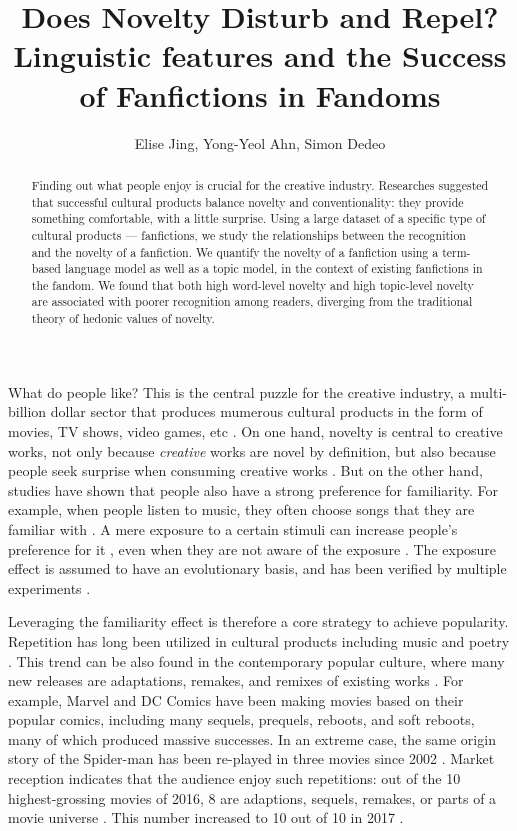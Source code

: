\documentclass[letterpaper]{article} %
\begin{document}
%
\title{Does Novelty Disturb and Repel? Linguistic features and the Success of Fanfictions in Fandoms}
\author{Elise Jing, Yong-Yeol Ahn, Simon Dedeo\\
}
\maketitle
\begin{abstract}
Finding out what people enjoy is crucial for the creative industry. Researches suggested that successful cultural products balance novelty and conventionality: they provide something comfortable, with a little surprise. Using a large dataset of a specific type of cultural products --- fanfictions, we study the relationships between the recognition and the novelty of a fanfiction. We quantify the novelty of a fanfiction using a term-based language model as well as a topic model, in the context of existing fanfictions in the fandom. We found that both high word-level novelty and high topic-level novelty are associated with poorer recognition among readers, diverging from the traditional theory of hedonic values of novelty.
\end{abstract}

\noindent 
What do people like? This is the central puzzle for the creative industry, a multi-billion dollar sector that produces mumerous cultural products in the form of movies, TV shows, video games, etc \cite{creativeindustries}. On one hand, novelty is central to creative works, not only because \emph{creative} works are novel by definition, but also because people seek surprise when consuming creative works \cite{hutter2011infinite}. But on the other hand, studies have shown that people also have a strong preference for familiarity. For example, when people listen to music, they often choose songs that they are familiar with \cite{thompson2014shazam}. A mere exposure to a certain stimuli can increase people's preference for it \cite{zajonc1968attitudinal}, even when they are not aware of the exposure \cite{kunst1980affective}. The exposure effect is assumed to have an evolutionary basis, and has been verified by multiple experiments \cite{bornstein1989exposure}.

Leveraging the familiarity effect is therefore a core strategy to achieve popularity. Repetition has long been utilized in cultural products including music and poetry \cite{huron2013psychological}. This trend can be also found in the contemporary popular culture, where many new releases are adaptations, remakes, and remixes of existing works \cite{manovich2007comes}. For example, Marvel and DC Comics have been making movies based on their popular comics, including many sequels, prequels, reboots, and soft reboots, many of which produced massive successes. In an extreme case, the same origin story of the Spider-man has been re-played in three movies since 2002 \cite{spiderman}. Market reception indicates that the audience enjoy such repetitions: out of the 10 highest-grossing movies of 2016, 8 are adaptions, sequels, remakes, or parts of a movie universe \cite{2016film}. This number increased to 10 out of 10 in 2017 \cite{2017film}. 
\end{document}
